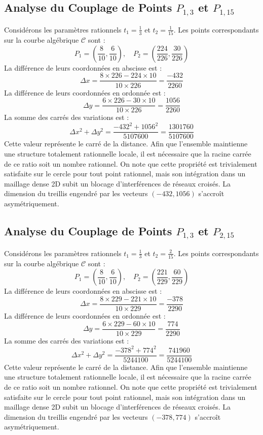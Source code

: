 \documentclass[12pt, a4paper]{article}
\begin{document}
\subsection{Analyse du Couplage de Points $P_{1,3}$ et $P_{1,15}$}
Considérons les paramètres rationnels $t_1 = \frac{1}{3}$ et $t_2 = \frac{1}{15}$.
Les points correspondants sur la courbe algébrique $\mathcal{C}$ sont :
$$ P_1 = \left( \frac{8}{10}, \frac{6}{10} \right), \quad P_2 = \left( \frac{224}{226}, \frac{30}{226} \right) $$
La différence de leurs coordonnées en abscisse est :
$$ \Delta x = \frac{8 \times 226 - 224 \times 10}{10 \times 226} = \frac{-432}{2260} $$
La différence de leurs coordonnées en ordonnée est :
$$ \Delta y = \frac{6 \times 226 - 30 \times 10}{10 \times 226} = \frac{1056}{2260} $$
La somme des carrés des variations est :
$$ \Delta x^2 + \Delta y^2 = \frac{ -432^2 + 1056^2 }{ 5107600 } = \frac{ 1301760 }{ 5107600 } $$
Cette valeur représente le carré de la distance. Afin que l'ensemble maintienne une structure totalement rationnelle locale, il est nécessaire que la racine carrée de ce ratio soit un nombre rationnel. On note que cette propriété est trivialement satisfaite sur le cercle pour tout point rationnel, mais son intégration dans un maillage dense 2D subit un blocage d'interférences de réseaux croisés. La dimension du treillis engendré par les vecteurs $( -432, 1056 )$ s'accroît asymétriquement.


\subsection{Analyse du Couplage de Points $P_{1,3}$ et $P_{2,15}$}
Considérons les paramètres rationnels $t_1 = \frac{1}{3}$ et $t_2 = \frac{2}{15}$.
Les points correspondants sur la courbe algébrique $\mathcal{C}$ sont :
$$ P_1 = \left( \frac{8}{10}, \frac{6}{10} \right), \quad P_2 = \left( \frac{221}{229}, \frac{60}{229} \right) $$
La différence de leurs coordonnées en abscisse est :
$$ \Delta x = \frac{8 \times 229 - 221 \times 10}{10 \times 229} = \frac{-378}{2290} $$
La différence de leurs coordonnées en ordonnée est :
$$ \Delta y = \frac{6 \times 229 - 60 \times 10}{10 \times 229} = \frac{774}{2290} $$
La somme des carrés des variations est :
$$ \Delta x^2 + \Delta y^2 = \frac{ -378^2 + 774^2 }{ 5244100 } = \frac{ 741960 }{ 5244100 } $$
Cette valeur représente le carré de la distance. Afin que l'ensemble maintienne une structure totalement rationnelle locale, il est nécessaire que la racine carrée de ce ratio soit un nombre rationnel. On note que cette propriété est trivialement satisfaite sur le cercle pour tout point rationnel, mais son intégration dans un maillage dense 2D subit un blocage d'interférences de réseaux croisés. La dimension du treillis engendré par les vecteurs $( -378, 774 )$ s'accroît asymétriquement.
\end{document}
